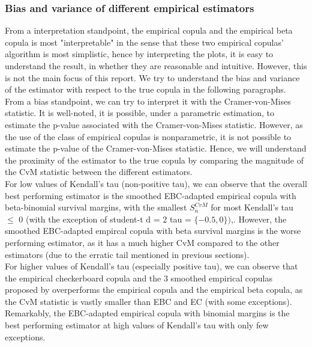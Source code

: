\documentclass[12pt]{report}
\newcommand{\1}{\mathbf{1}}
\begin{document}
\begin{flushleft}
\subsubsection{Bias and variance of different empirical estimators}
From a interpretation standpoint, the empirical copula and the empirical beta copula is most "interpretable" in the sense that these two empirical copulas' algorithm is most simplistic, hence by interpreting the plots, it is easy to understand the result, in whether they are reasonable and intuitive. However, this is not the main focus of this report. We try to understand the bias and variance of the estimator with respect to the true copula in the following paragraphs.\\ 
\vspace{0.5cm}
From a bias standpoint, we can try to interpret it with the Cramer-von-Mises statistic. It is well-noted, it is possible, under a parametric estimation, to estimate the p-value associated with the Cramer-von-Mises statistic. However, as the use of the class of empirical copulas is nonparametric, it is not possible to estimate the p-value of the Cramer-von-Mises statistic. Hence, we will understand the proximity of the estimator to the true copula by comparing the magnitude of the CvM statistic between the different estimators.\\
\vspace{0.5cm}
For low values of Kendall's tau (non-positive tau), we can observe that the overall best performing estimator is the smoothed EBC-adapted empirical copula with beta-binomial survival margins, with the smallest $S^{CvM}_{n}$ for most Kendall's tau $\le$ 0 (with the exception of student-t d = 2 tau = $\{-0.5, 0\})$,. However, the smoothed EBC-adapted empircal copula with beta survival margins is the worse performing estimator, as it has a much higher CvM compared to the other estimators (due to the erratic tail mentioned in previous sections).\\
\vspace{0.5cm}
For higher values of Kendall's tau (especially positive tau), we can observe that the empirical checkerboard copula and the 3 smoothed empirical copulas proposed by \cite{KojadinovicYi2024Smooth} overperforms the empirical copula and the empirical beta copula, as the CvM statistic is vastly smaller than EBC and EC (with some exceptions). Remarkably, the EBC-adapted empirical copula with binomial margins is the best performing estimator at high values of Kendall's tau with only few exceptions.\\

\end{flushleft}
\end{document}

